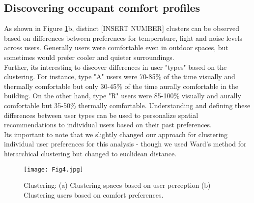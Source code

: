 \subsection{Discovering occupant comfort profiles}
 
As shown in Figure \ref{fig:clustering}b, distinct [INSERT NUMBER] clusters can be observed based on differences between preferences for temperature, light and noise levels across users. Generally users were comfortable even in outdoor spaces, but sometimes would prefer cooler and quieter surroundings.\\

Further, its interesting to discover differences in user "types" based on the clustering. For instance, type "A" users were 70-85\% of the time visually and thermally comfortable but only 30-45\% of the time aurally comfortable in the building. On the other hand, type "R" users were 85-100\% visually and aurally comfortable but 35-50\% thermally comfortable. Understanding and defining these differences between user types can be used to personalize spatial recommendations to individual users based on their past preferences.\\       

Its important to note that we slightly changed our approach for clustering individual user preferences for this analysis - though we used Ward's method for hierarchical clustering but changed to euclidean distance.   


\begin{figure}
\begin{center}
\texttt{[image: Fig4.jpg]}
\caption{Clustering: (a) Clustering spaces based on user perception (b) Clustering users based on comfort preferences.}
\label{fig:clustering}
\end{center}
\end{figure}

